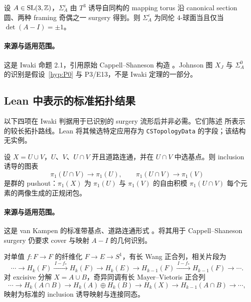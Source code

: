 \begin{externalresult}[Iwaki 命题 2.1]\label{prop:cs-criterion}
设 $A\in\mathrm{SL}(3,\mathbb{Z})$，$\Sigma_A^\varepsilon$ 由 $T^3$ 诱导自同构的 mapping torus 沿 canonical section 圆、两种 framing 奇偶之一 surgery 得到。则 $\Sigma_A^\varepsilon$ 为同伦 $4$-球面当且仅当 $\det(A-I)=\pm1$。
\end{externalresult}

\paragraph{来源与适用范围。}
这是 Iwaki 命题 2.1，引用原始 Cappell--Shaneson 构造 \cite[Proposition~2.1]{Iwaki2024,CappellShaneson1976}。Johnson 图 $X_J$ 与 $\Sigma_A^0$ 的识别是假设~\ref{hyp:P0} 与 P3/E13，不是 Iwaki 定理的一部分。

\subsection{Lean 中表示的标准拓扑结果}

以下四项在 Iwaki 判据用于已识别的 surgery 流形后并非必需。它们陈述  所表示的较长拓扑路线。Lean 将其候选特定应用存为 \texttt{CSTopologyData} 的字段；该结构无实例。

\begin{externalresult}\label{prop:van-kampen}
设 $X=U\cup V$，$U$、$V$、$U\cap V$ 开且道路连通，并在 $U\cap V$ 中选基点。则 inclusion 诱导的图表
\[
\pi_1(U\cap V)\longrightarrow\pi_1(U),
\qquad
\pi_1(U\cap V)\longrightarrow\pi_1(V)
\]
是群的 pushout：$\pi_1(X)$ 为 $\pi_1(U)$ 与 $\pi_1(V)$ 的自由积模 $\pi_1(U\cap V)$ 每个元素的两像生成的正规闭包。
\end{externalresult}

\paragraph{来源与适用范围。}
这是 van Kampen 的标准带基点、道路连通形式 \cite[Section~1.2]{Hatcher2002}。将其用于 Cappell--Shaneson surgery 仍要求 cover 与映射 $A-I$ 的几何识别。

\begin{externalresult}\label{prop:wang-mv}
对单值 $f:F\to F$ 的纤维化 $F\to E\to S^1$，有长 Wang 正合列，相关片段为
\[
\cdots\to H_k(F)\xrightarrow{\,I-f_*\,}H_k(F)
\longrightarrow H_k(E)\longrightarrow
H_{k-1}(F)\xrightarrow{\,I-f_*\,}H_{k-1}(F)\to\cdots.
\]
对 excisive 分解 $X=A\cup B$，奇异同调有长 Mayer--Vietoris 正合列
\[
\cdots\to H_k(A\cap B)\to H_k(A)\oplus H_k(B)
\to H_k(X)\to H_{k-1}(A\cap B)\to\cdots,
\]
映射为标准的 inclusion 诱导映射与连接同态。
\end{externalresult}


